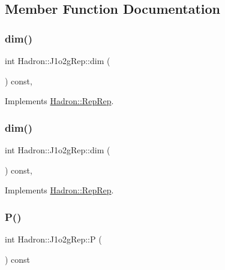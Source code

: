\subsection{Member Function Documentation}
\mbox{\label{structHadron_1_1J1o2gRep_afbe3a5f8d11261126c36952b2fcac25c}} 
\subsubsection{\texorpdfstring{dim()}{dim()}\hspace{0.1cm}{\footnotesize\ttfamily [1/2]}}
{\footnotesize\ttfamily int Hadron\+::\+J1o2g\+Rep\+::dim (\begin{DoxyParamCaption}{ }\end{DoxyParamCaption}) const\hspace{0.3cm}{\ttfamily [inline]}, {\ttfamily [virtual]}}



Implements \mbox{\hyperlink{structHadron_1_1RepRep_a92c8802e5ed7afd7da43ccfd5b7cd92b}{Hadron\+::\+Rep\+Rep}}.

\mbox{\label{structHadron_1_1J1o2gRep_afbe3a5f8d11261126c36952b2fcac25c}} 
\subsubsection{\texorpdfstring{dim()}{dim()}\hspace{0.1cm}{\footnotesize\ttfamily [2/2]}}
{\footnotesize\ttfamily int Hadron\+::\+J1o2g\+Rep\+::dim (\begin{DoxyParamCaption}{ }\end{DoxyParamCaption}) const\hspace{0.3cm}{\ttfamily [inline]}, {\ttfamily [virtual]}}



Implements \mbox{\hyperlink{structHadron_1_1RepRep_a92c8802e5ed7afd7da43ccfd5b7cd92b}{Hadron\+::\+Rep\+Rep}}.

\mbox{\label{structHadron_1_1J1o2gRep_a23669238b8f2c4ecfbabacf36c40d2b3}} 
\subsubsection{\texorpdfstring{P()}{P()}\hspace{0.1cm}{\footnotesize\ttfamily [1/2]}}
{\footnotesize\ttfamily int Hadron\+::\+J1o2g\+Rep\+::P (\begin{DoxyParamCaption}{ }\end{DoxyParamCaption}) const\hspace{0.3cm}{\ttfamily [inline]}}

